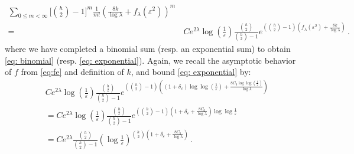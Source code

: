 \documentclass[a4paper,reqno,11pt]{amsart}
\makeatletter
\renewenvironment{proof}[1][\proofname]{\par
\pushQED{\qed}%
\normalfont \topsep4\p@\@plus4\p@\relax
\trivlist
\item[\hskip\labelsep
\bfseries
#1\@addpunct{.}]\ignorespaces
}{%
\popQED\endtrivlist\@endpefalse
}
\numberwithin{equation}{section}
\theoremstyle{mytheorem}
\newcommand{\gd}{\delta}
\newcommand{\gl}{\lambda}
\renewcommand{\epsilon}{\varepsilon}
\newcommand\qa{\bigg[}
\newcommand\qb{\bigg]}
\newcommand\ra{\left(}
\newcommand\rb{\right)}
\newcommand{\f}{\frac}
\newcommand{\dlog}{\log\log}
\makeatother
\begin{document}
{\begin{proof}[Proof of Proposition \ref{thm: g upper bound}]
\begin{align}
    \sum_{0\le m < \infty}
    \qa {h\choose 2}-1 \qb^m 
    \frac{1}{m!}
    \ra \f{8k}{\log\gl} + f_\gl(\epsilon^2) \rb^m\\
    =&\, \label{eq: exponential}
    C e^{2\gl}
    \log \ra \f{1}{\epsilon} \rb \f{{h\choose 2}}{{h\choose 2}-1}
    e^{ \ra {h\choose 2}-1 \rb \ra f_\gl(\epsilon^2)+\f{8k}{\log\gl} \rb } \,.
\end{align}
where we have completed a binomial sum (resp. an exponential sum) to obtain \eqref{eq: binomial} (resp. \eqref{eq: exponential}). Again, we recall the asymptotic behavior of $f$ from  \eqref{eq:fe} and definition of $k$, and bound \eqref{eq: exponential} by:
\begin{equation}\label{eq: final bound for m<k}
\begin{split}
    & C e^{2\gl}
    \log \ra \f{1}{\epsilon} \rb \f{{h\choose 2}}{{h\choose 2}-1}
    e^{ \ra {h\choose 2}-1 \rb \ra (1+\gd_\epsilon)\dlog(\f{1}{\epsilon})+\f{8C_0\dlog(\f{1}{\epsilon})}{\log\gl} \rb }\\
    & =
    C e^{2\gl}
    \log \ra \f{1}{\epsilon} \rb \f{{h\choose 2}}{{h\choose 2}-1}
    e^{ \ra {h\choose 2}-1 \rb \ra 1+\gd_\epsilon + \f{8C_0}{\log\gl} \rb \dlog\f{1}{\epsilon} }\\
    & = C e^{2\gl}
    \f{{h\choose 2}}{{h\choose 2}-1} \ra \log \f{1}{\epsilon}  \rb^{{h\choose 2} \ra 
1+\gd_\epsilon +\f{8C_0}{\log\gl} \rb} \,.
\end{split}
\end{equation}


\end{proof}}
\end{document}
